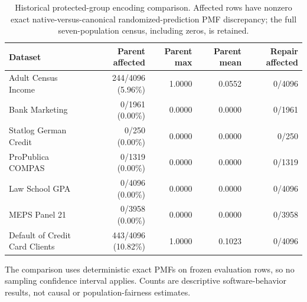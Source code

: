 \begin{table}[H]
\centering
\caption{Historical protected-group encoding comparison. Affected rows have nonzero exact native-versus-canonical randomized-prediction PMF discrepancy; the full seven-population census, including zeros, is retained.}
\label{tab:historical-census}
\small
\begin{tabular}{@{}lrrrr@{}}
\toprule
Dataset & Parent affected & Parent max & Parent mean & Repair affected \\
\midrule
Adult Census Income & 244/4096 (5.96\%) & 1.0000 & 0.0552 & 0/4096 \\
Bank Marketing & 0/1961 (0.00\%) & 0.0000 & 0.0000 & 0/1961 \\
Statlog German Credit & 0/250 (0.00\%) & 0.0000 & 0.0000 & 0/250 \\
ProPublica COMPAS & 0/1319 (0.00\%) & 0.0000 & 0.0000 & 0/1319 \\
Law School GPA & 0/4096 (0.00\%) & 0.0000 & 0.0000 & 0/4096 \\
MEPS Panel 21 & 0/3958 (0.00\%) & 0.0000 & 0.0000 & 0/3958 \\
Default of Credit Card Clients & 443/4096 (10.82\%) & 1.0000 & 0.1023 & 0/4096 \\
\bottomrule
\end{tabular}
\vspace{2pt}
\begin{minipage}{0.98\linewidth}\footnotesize
The comparison uses deterministic exact PMFs on frozen evaluation rows, so no sampling confidence interval applies. Counts are descriptive software-behavior results, not causal or population-fairness estimates.
\end{minipage}
\end{table}

